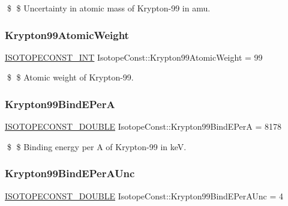 \$ \$ Uncertainty in atomic mass of Krypton-\/99 in amu. \mbox{\label{group___isotope_const-_krypton-_kr99_ga2af73d7a6525234c34d1e221dd6f8899}} 
\subsubsection{\texorpdfstring{Krypton99\+Atomic\+Weight}{Krypton99AtomicWeight}}
{\footnotesize\ttfamily \mbox{\hyperlink{group___isotope_const-_macros_ga5f18360b3e99483a35c32d789e62621c}{I\+S\+O\+T\+O\+P\+E\+C\+O\+N\+S\+T\+\_\+\+I\+NT}} Isotope\+Const\+::\+Krypton99\+Atomic\+Weight = 99}

\$ \$ Atomic weight of Krypton-\/99. \mbox{\label{group___isotope_const-_krypton-_kr99_ga4a92534a9c34c43683a328da019b0d8e}} 
\subsubsection{\texorpdfstring{Krypton99\+Bind\+E\+PerA}{Krypton99BindEPerA}}
{\footnotesize\ttfamily \mbox{\hyperlink{group___isotope_const-_macros_ga8f45a7272ce02c0b4c65c44636ed719a}{I\+S\+O\+T\+O\+P\+E\+C\+O\+N\+S\+T\+\_\+\+D\+O\+U\+B\+LE}} Isotope\+Const\+::\+Krypton99\+Bind\+E\+PerA = 8178}

\$ \$ Binding energy per A of Krypton-\/99 in keV. \mbox{\label{group___isotope_const-_krypton-_kr99_gac435f85d991415aa4e605f7a284a559b}} 
\subsubsection{\texorpdfstring{Krypton99\+Bind\+E\+Per\+A\+Unc}{Krypton99BindEPerAUnc}}
{\footnotesize\ttfamily \mbox{\hyperlink{group___isotope_const-_macros_ga8f45a7272ce02c0b4c65c44636ed719a}{I\+S\+O\+T\+O\+P\+E\+C\+O\+N\+S\+T\+\_\+\+D\+O\+U\+B\+LE}} Isotope\+Const\+::\+Krypton99\+Bind\+E\+Per\+A\+Unc = 4}

